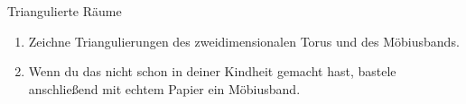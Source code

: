 \documentclass{uebblatt}
\begin{document}
\begin{aufgabe}{Triangulierte Räume}
\begin{enumerate}
\item Zeichne Triangulierungen des zweidimensionalen Torus und des Möbiusbands.
\item Wenn du das nicht schon in deiner Kindheit gemacht hast, bastele anschließend
mit echtem Papier ein Möbiusband.
\end{enumerate}
\end{aufgabe}
\end{document}
